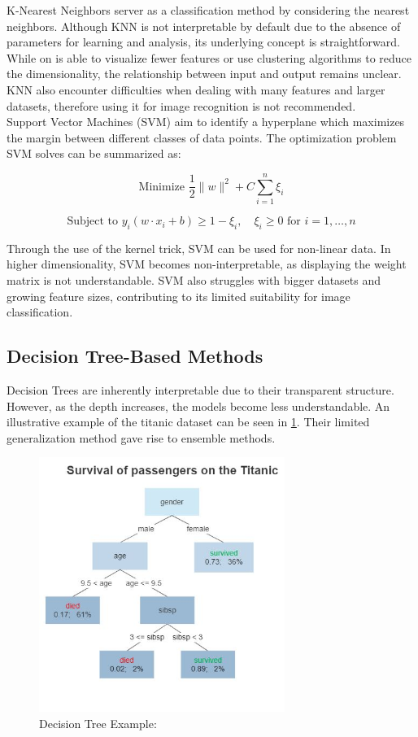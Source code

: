 K-Nearest Neighbors server as a classification method by considering the nearest neighbors. Although KNN is not interpretable by default due to the absence of parameters for learning and analysis, its underlying concept is straightforward. While on is able to visualize fewer features or use clustering algorithms to reduce the dimensionality, the relationship between input and output remains unclear. KNN also encounter difficulties when dealing with many features and larger datasets, therefore using it for image recognition is not recommended.
\\
Support Vector Machines (SVM) aim to identify a hyperplane which maximizes the margin between different classes of data points. The optimization problem SVM solves can be summarized as:

$$\text{Minimize } \frac{1}{2} \|w\|^2 + C \sum_{i=1}^{n} \xi_i$$

$$\text{Subject to } y_i (w \cdot x_i + b) \geq 1 - \xi_i, \quad \xi_i \geq 0 \text{ for } i = 1, \ldots, n$$

Through the use of the kernel trick, SVM can be used for non-linear data. In higher dimensionality, SVM becomes non-interpretable, as displaying the weight matrix is not understandable. SVM also struggles with bigger datasets and growing feature sizes, contributing to its limited suitability for image classification.


\subsection{Decision Tree-Based Methods}
\label{decision_tree}

Decision Trees are inherently interpretable due to their transparent structure. However, as the depth increases, the models become less understandable. An illustrative  example of the titanic dataset can be seen in \ref{fig:decision_tree}. Their limited generalization method gave rise to ensemble methods.

\begin{figure}[h!]
	\centering
	\includegraphics[width=80mm]{figs/Decision_Tree}
	\caption[Decision Tree Example]{Decision Tree Example: \cite{decisiontree}}
	\label{fig:decision_tree}
\end{figure}
 


